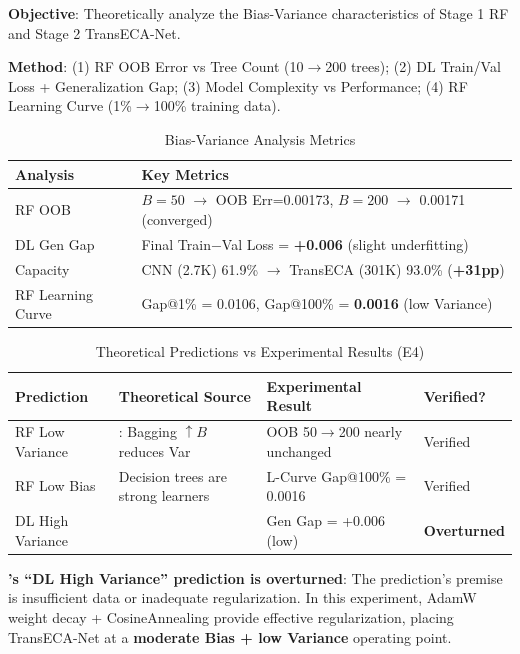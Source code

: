 \documentclass[sigconf]{acmart}
\begin{document}
\textbf{Objective}: Theoretically analyze the Bias-Variance characteristics of Stage 1 RF and Stage 2 TransECA-Net.

\textbf{Method}: (1) RF OOB Error vs Tree Count (10$\to$200 trees); (2) DL Train/Val Loss + Generalization Gap; (3) Model Complexity vs Performance; (4) RF Learning Curve (1\%$\to$100\% training data).

\begin{table}[H]
\caption{Bias-Variance Analysis Metrics}
\label{tab:bias_variance}
\begin{tabular}{ll}
\toprule
\textbf{Analysis} & \textbf{Key Metrics} \\
\midrule
RF OOB & $B=50$ $\to$ OOB Err=0.00173, $B=200$ $\to$ 0.00171 (converged) \\
DL Gen Gap & Final Train$-$Val Loss = \textbf{+0.006} (slight underfitting) \\
Capacity & CNN (2.7K) 61.9\% $\to$ TransECA (301K) 93.0\% (\textbf{+31pp}) \\
RF Learning Curve & Gap@1\% = 0.0106, Gap@100\% = \textbf{0.0016} (low Variance) \\
\bottomrule
\end{tabular}
\end{table}

\begin{table}[H]
\caption{Theoretical Predictions vs Experimental Results (E4)}
\label{tab:e4_theory}
\begin{tabular}{llll}
\toprule
\textbf{Prediction} & \textbf{Theoretical Source} & \textbf{Experimental Result} & \textbf{Verified?} \\
\midrule
RF Low Variance & \cite{3}: Bagging $\uparrow B$ reduces Var & OOB 50$\to$200 nearly unchanged & Verified \\
RF Low Bias & Decision trees are strong learners & L-Curve Gap@100\% = 0.0016 & Verified \\
DL High Variance & \cite{5} & Gen Gap = +0.006 (low) & \textbf{Overturned} \\
\bottomrule
\end{tabular}
\end{table}

\textbf{\cite{5}'s ``DL High Variance'' prediction is overturned}: The prediction's premise is insufficient data or inadequate regularization. In this experiment, AdamW weight decay + CosineAnnealing provide effective regularization, placing TransECA-Net at a \textbf{moderate Bias + low Variance} operating point.
\end{document}
